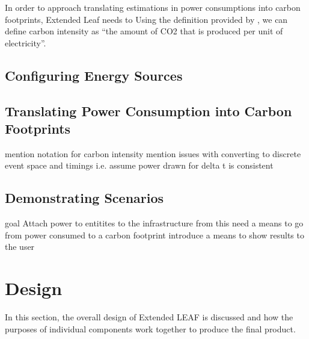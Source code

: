 \documentclass{l4proj}
\begin{document}
%
In order to approach translating estimations in power consumptions into carbon footprints, Extended Leaf needs to
Using the definition provided by \cite{owid-electricity-mix}, we can define carbon intensity as ``the amount of CO2 that is produced per unit of electricity''.
\section{Configuring Energy Sources}
\section{Translating Power Consumption into Carbon Footprints}
mention notation for carbon intensity
mention issues with converting to discrete event space and timings i.e. assume power drawn for delta t is consistent
\section{Demonstrating Scenarios}

goal Attach power to entitites to the infrastructure
from this need a means to go from power consumed to a carbon footprint
introduce a means to show results to the user

\chapter{Design}\label{ch:design}

In this section, the overall design of Extended LEAF is discussed and how the purposes of individual components work together to produce the final product.

\end{document}
